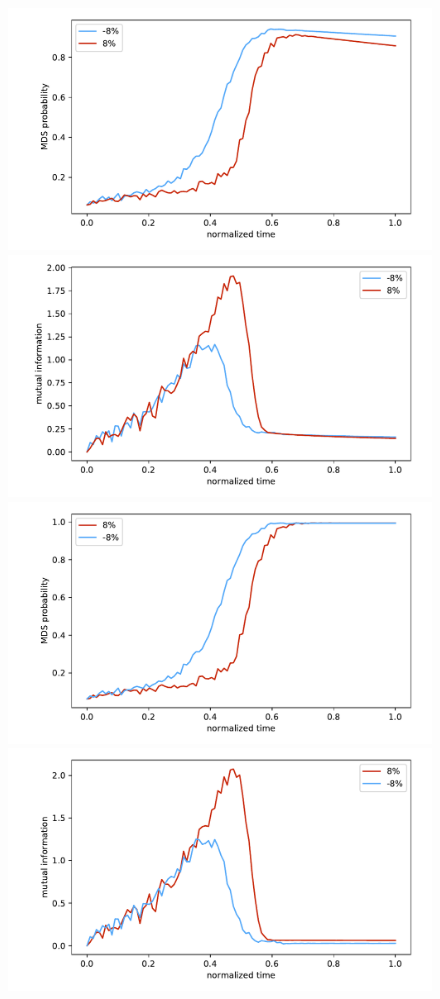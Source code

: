 \documentclass[prd,twocolumn,tightenlines,preprintnumbers,showpacs,superscriptaddress,notitlepage,nofootinbib,eqsecnum,floatfix,longbibliography]{revtex4}
\begin{document}
\begin{figure}
	\centering
	\includegraphics[width=\columnwidth]{./figures/full_prob_deco.pdf}
	\includegraphics[width=\columnwidth]{./figures/mutual_info_deco.pdf}
	\includegraphics[width=\columnwidth]{./figures/full_prob_nodeco.pdf}
	\includegraphics[width=\columnwidth]{./figures/mutual_info_nodeco.pdf}

\end{figure}
\end{document}
